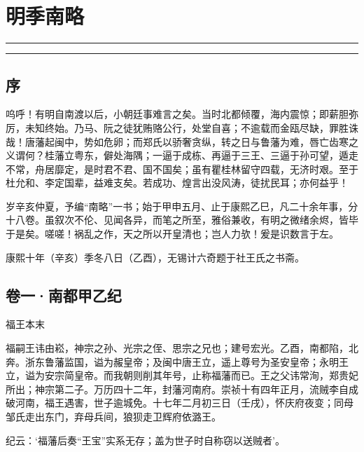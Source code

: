 \documentclass[]{article}
\date{}
\begin{document}
\hypertarget{header-n0}{%
\section{明季南略}\label{header-n0}}

\begin{center}\rule{0.5\linewidth}{\linethickness}\end{center}

\tableofcontents

\begin{center}\rule{0.5\linewidth}{\linethickness}\end{center}

\hypertarget{header-n10}{%
\subsection{序}\label{header-n10}}

呜呼！有明自南渡以后，小朝廷事难言之矣。当时北都倾覆，海内震惊；即薪胆弥厉，未知终始。乃马、阮之徒犹贿赂公行，处堂自喜；不逾载而金瓯尽缺，罪胜诛哉！唐藩起闽中，势如危卵；而郑氏以骄奢贪纵，转之日与鲁藩为难，唇亡齿寒之义谓何？桂藩立粤东，僻处海隅；一逼于成栋、再逼于三王、三逼于孙可望，遁走不常，舟居靡定，是时君不君、国不国矣；虽有瞿桂林留守四载，无济时艰。至于杜允和、李定国辈，益难支矣。若成功、煌言出没风涛，徒扰民耳；亦何益乎！

岁辛亥仲夏，予编``南略''一书；始于甲申五月、止于康熙乙巳，凡二十余年事，分十八卷。虽叙次不伦、见闻各异，而笔之所至，雅俗兼收，有明之微绪余烬，皆毕于是矣。嗟嗟！祸乱之作，天之所以开皇清也；岂人力欤！爰是识数言于左。

康熙十年（辛亥）季冬八日（乙酉），无锡计六奇题于社王氏之书斋。

\hypertarget{header-n17}{%
\subsection{卷一·南都甲乙纪}\label{header-n17}}

福王本末

福嗣王讳由崧，神宗之孙、光宗之侄、思宗之兄也；建号宏光。乙酉，南都陷，北奔。浙东鲁藩监国，谥为赧皇帝；及闽中唐王立，遥上尊号为圣安皇帝；永明王立，谥为安宗简皇帝。而我朝则削其年号，止称福藩而已。王之父讳常洵，郑贵妃所出；神宗第二子。万历四十二年，封藩河南府。崇祯十有四年正月，流贼李自成破河南，福王遇害，世子逾城免。十七年二月初三日（壬戌），怀庆府夜变；同母邹氏走出东门，弃母兵间，狼狈走卫辉府依潞王。

纪云：`福藩后奏``王宝''实系无存；盖为世子时自称窃以送贼者'。
\end{document}
